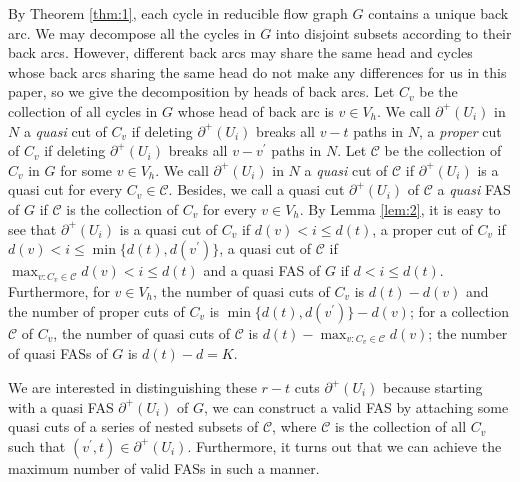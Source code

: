 \documentclass[11pt]{article}
\begin{document}
By Theorem \ref{thm:1}, each cycle in reducible flow graph $G$ contains a unique back arc. We may decompose all the cycles in $G$ into disjoint subsets according to their back arcs. However, different back arcs may share the same head and cycles whose back arcs sharing the same head do not make any differences for us in this paper, so we give the decomposition by heads of back arcs. Let $C_v$ be the collection of all cycles in $G$ whose head of back arc is $v\in V_h$. We call $\partial^+(U_i)$ in $N$ a \emph{quasi} cut of $C_v$ if deleting $\partial^+(U_i)$ breaks all $v-t$ paths in $N$, a \emph{proper} cut of $C_v$ if deleting $\partial^+(U_i)$ breaks all $v-v^\prime$ paths in $N$. Let $\mathcal{C}$ be the collection of $C_v$ in $G$ for some $v\in V_h$. We call $\partial^+(U_i)$ in $N$ a \emph{quasi} cut of $\mathcal{C}$ if $\partial^+(U_i)$ is a quasi cut for every $C_v\in\mathcal{C}$. Besides, we call a quasi cut $\partial^+(U_i)$ of $\mathcal{C}$ a \emph{quasi} FAS of $G$ if $\mathcal{C}$ is the collection of $C_v$ for every $v\in V_h$. By Lemma \ref{lem:2}, it is easy to see that $\partial^+(U_i)$ is a quasi cut of $C_v$ if $d(v) <i\leq d(t)$, a proper cut of $C_v$ if $d(v)<i\leq \min\{d(t),d(v^\prime)\}$, a quasi cut of $\mathcal{C}$ if $\max_{v:C_v\in \mathcal{C}}d(v)<i\leq d(t)$ and a quasi FAS of $G$ if $d<i\leq d(t)$. Furthermore, for $v\in V_h$, the number of quasi cuts of $C_v$ is $d(t)-d(v)$ and the number of proper cuts of $C_v$ is $\min\{d(t),d(v^\prime)\}-d(v)$; for a collection $\mathcal{C}$ of $C_v$, the number of quasi cuts of $\mathcal{C}$ is $d(t)-\max_{v:C_v\in \mathcal{C}}d(v)$; the number of quasi FASs of $G$ is $d(t)-d=K$.

We are interested in distinguishing these $r-t$ cuts $\partial^+(U_i)$ because starting with a quasi FAS $\partial^+(U_i)$ of $G$, we can construct a valid FAS by attaching some quasi cuts of a series of nested subsets of $\mathcal{C}$, where $\mathcal{C}$ is the collection of all $C_v$ such that $(v^\prime,t)\in \partial^+(U_i)$. Furthermore, it turns out that we can achieve the maximum number of valid FASs in such a manner.
\end{document}
